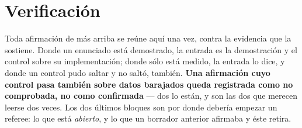\documentclass[11pt,a4paper]{article}
\begin{document}
\section{Verificación}\label{sec:verif}

Toda afirmación de más arriba se reúne aquí una vez, contra la evidencia que la sostiene. Donde
un enunciado está demostrado, la entrada es la demostración y el control sobre su
implementación; donde sólo está medido, la entrada lo dice, y donde un control pudo saltar y no
saltó, también. \textbf{Una afirmación cuyo control pasa también sobre datos barajados queda
registrada como no comprobada, no como confirmada} --- dos lo están, y son las dos que merecen
leerse dos veces. Los dos últimos bloques son por donde debería empezar un referee: lo que está
\emph{abierto}, y lo que un borrador anterior afirmaba y éste retira.
\end{document}
